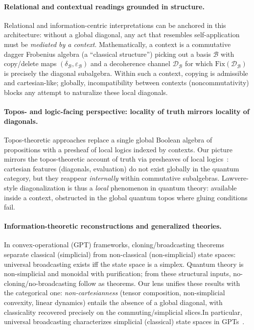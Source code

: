 \documentclass[11pt]{article}
\theoremstyle{upright}
\begin{document}
\paragraph{Relational and contextual readings grounded in structure.}
Relational and information-centric interpretations can be anchored in this architecture: without a global diagonal, any act that resembles self-application must be \emph{mediated by a context}. Mathematically, a context is a commutative dagger Frobenius algebra (a ``classical structure'') picking out a basis $\mathcal{B}$ with copy/delete maps $(\delta_{\mathcal{B}},\varepsilon_{\mathcal{B}})$ and a decoherence channel $\mathcal{D}_{\mathcal{B}}$ for which $\mathrm{Fix}(\mathcal{D}_{\mathcal{B}})$ is precisely the diagonal subalgebra. Within such a context, copying is admissible and cartesian-like; globally, incompatibility between contexts (noncommutativity) blocks any attempt to naturalize these local diagonals.

\paragraph{Topos- and logic-facing perspective: locality of truth mirrors locality of diagonals.}
Topos-theoretic approaches replace a single global Boolean algebra of propositions with a presheaf of local logics indexed by contexts. Our picture mirrors the topos-theoretic account of truth via presheaves of local logics~\cite{DoeringIsham2008}: cartesian features (diagonals, evaluation) do not exist globally in the quantum category, but they reappear \emph{internally} within commutative subalgebras. Lawvere-style diagonalization is thus a \emph{local} phenomenon in quantum theory: available inside a context, obstructed in the global quantum topos where gluing conditions fail.

\paragraph{Information-theoretic reconstructions and generalized theories.}
In convex-operational (GPT) frameworks, cloning/broadcasting theorems separate classical (simplicial) from non-classical (non-simplicial) state spaces: universal broadcasting exists iff the state space is a simplex. Quantum theory is non-simplicial and monoidal with purification; from these structural inputs, no-cloning/no-broadcasting follow as theorems. Our lens unifies these results with the categorical one: \emph{non-cartesianness} (tensor composition, non-simplicial convexity, linear dynamics) entails the absence of a global diagonal, with classicality recovered precisely on the commuting/simplicial slices.In particular, universal broadcasting characterizes simplicial (classical) state spaces in GPTs~\cite{BarnumEtAl2007}.
\end{document}

